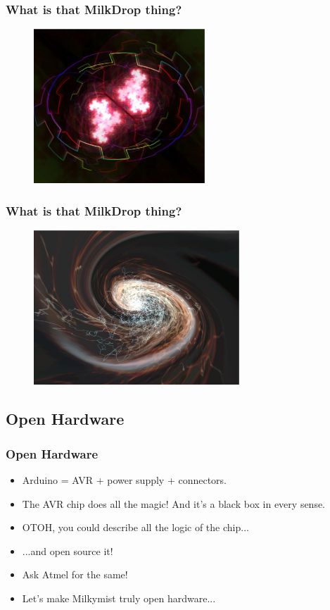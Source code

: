 \documentclass{beamer}
\begin{document}
\frame
{
  \frametitle{What is that MilkDrop thing?}
  \begin{figure}[H]
  \includegraphics[height=58mm]{milkdrop2.eps}
  \end{figure}
}

\frame
{
  \frametitle{What is that MilkDrop thing?}
  \begin{figure}[H]
  \includegraphics[height=58mm]{milkdrop3.eps}
  \end{figure}
}

\subsection{Open Hardware}
\frame
{
  \frametitle{Open Hardware}

  \begin{itemize}
  \item Arduino = AVR + power supply + connectors.
  \item The AVR chip does all the magic! And it's a black box in every sense.
  \item OTOH, you could describe all the logic of the chip...
  \item ...and open source it!
  \item Ask Atmel for the same!
  \item Let's make Milkymist truly open hardware...
  \end{itemize}
}
\end{document}
